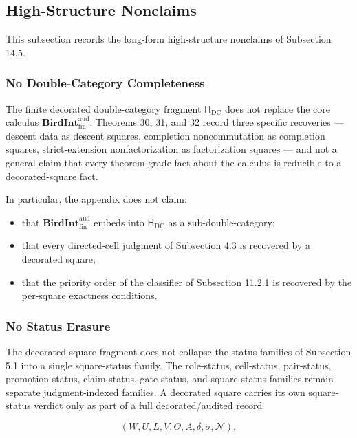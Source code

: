 \documentclass[11pt]{article}
\providecommand{\tightlist}{}
\theoremstyle{definition}
\begin{document}
\subsection{High-Structure Nonclaims}

This subsection records the long-form high-structure nonclaims of Subsection 14.5.

\subsubsection{No Double-Category Completeness}

The finite decorated double-category fragment \(\mathsf H_{\mathrm{DC}}\) does not replace the core calculus \(\mathbf{BirdInt}^{\mathrm{aud}}_{\mathrm{fin}}\). Theorems 30, 31, and 32 record three specific recoveries --- descent data as descent squares, completion noncommutation as completion squares, strict-extension nonfactorization as factorization squares --- and not a general claim that every theorem-grade fact about the calculus is reducible to a decorated-square fact.

In particular, the appendix does not claim:

\begin{itemize}
\tightlist
\item
  that \(\mathbf{BirdInt}^{\mathrm{aud}}_{\mathrm{fin}}\) embeds into \(\mathsf H_{\mathrm{DC}}\) as a sub-double-category;
\item
  that every directed-cell judgment of Subsection 4.3 is recovered by a decorated square;
\item
  that the priority order of the classifier of Subsection 11.2.1 is recovered by the per-square exactness conditions.
\end{itemize}

\subsubsection{No Status Erasure}

The decorated-square fragment does not collapse the status families of Subsection 5.1 into a single square-status family. The role-status, cell-status, pair-status, promotion-status, claim-status, gate-status, and square-status families remain separate judgment-indexed families. A decorated square carries its own square-status verdict only as part of a full decorated/audited record

\[
(W,U,L,V,\Theta,A,\delta,\sigma,\mathcal N),
\]
\end{document}
